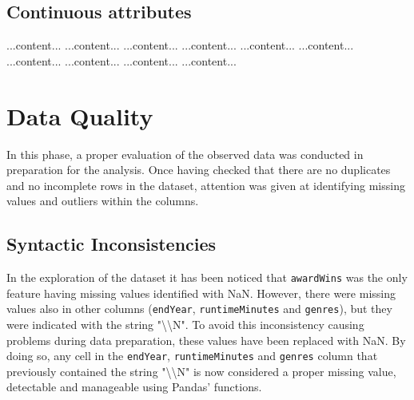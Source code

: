 \subsection{Continuous attributes}
...content...
...content...
...content...
...content...
...content...
...content...
...content...
...content...
...content...
...content...


\section{Data Quality}\label{sec:data_quality}
In this phase, a proper evaluation of the observed data was conducted in preparation for the analysis.
Once having checked that there are no duplicates and no incomplete rows in the dataset, attention was given at identifying missing values and outliers within the columns.

\subsection{Syntactic Inconsistencies}
In the exploration of the dataset it has been noticed that \texttt{awardWins} was the only feature having missing values identified with NaN.
However, there were missing values also in other columns (\texttt{endYear}, \texttt{runtimeMinutes} and \texttt{genres}), but they were indicated with the string "\textbackslash\textbackslash N".
To avoid this inconsistency causing problems during data preparation, these values have been replaced with NaN.
By doing so, any cell in the \texttt{endYear}, \texttt{runtimeMinutes} and \texttt{genres} column that previously contained the string "\textbackslash\textbackslash N" is now considered a proper missing value, detectable and manageable using Pandas' functions.

